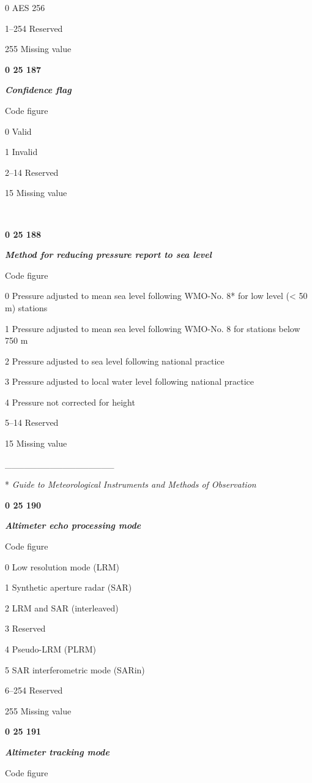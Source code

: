 0 AES 256

1--254 Reserved

255 Missing value

\textbf{0 25 187}

\emph{\textbf{Confidence flag}}

Code figure

0 Valid

1 Invalid

2--14 Reserved

15 Missing value

\textbf{\\
}

\textbf{0 25 188}

\emph{\textbf{Method for reducing pressure report to sea level}}

Code figure

0 Pressure adjusted to mean sea level following WMO-No. 8* for low level (\textless{} 50 m) stations

1 Pressure adjusted to mean sea level following WMO-No. 8 for stations below 750 m

2 Pressure adjusted to sea level following national practice

3 Pressure adjusted to local water level following national practice

4 Pressure not corrected for height

5--14 Reserved

15 Missing value

\_\_\_\_\_\_\_\_\_\_\_\_\_\_\_\_\_

* \emph{Guide to Meteorological Instruments and Methods of Observation}

\textbf{0 25 190}

\emph{\textbf{Altimeter echo processing mode}}

Code figure

0 Low resolution mode (LRM)

1 Synthetic aperture radar (SAR)

2 LRM and SAR (interleaved)

3 Reserved

4 Pseudo-LRM (PLRM)

5 SAR interferometric mode (SARin)

6--254 Reserved

255 Missing value

\textbf{0 25 191}

\emph{\textbf{Altimeter tracking mode}}

Code figure

